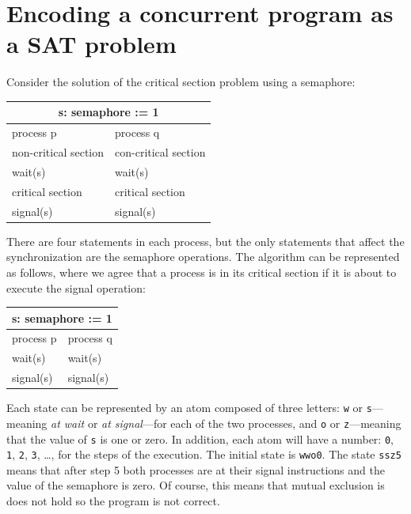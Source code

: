 \documentclass[11pt]{report}
\newcommand*{\p}[1]{\textup{\texttt{#1}}}
\begin{document}
\section{Encoding a concurrent program as a SAT problem}

Consider the solution of the critical section problem using a semaphore:

\begin{center}
\begin{tabular}{|l|l|}
\hline
\multicolumn{2}{|c|}{s: semaphore := 1}\\\hline
process p & process q\\\hline
non-critical section & con-critical section \\
wait(s) & wait(s) \\
critical section & critical section \\
signal(s) & signal(s)\\\hline
\end{tabular}
\end{center}

There are four statements in each process, but the only statements that
affect the synchronization are the semaphore operations. The algorithm
can be represented as follows, where we agree that a process is in its
critical section if it is about to execute the signal operation:

\begin{center}
\begin{tabular}{|l|l|}
\hline
\multicolumn{2}{|c|}{s: semaphore := 1}\\\hline
process p & process q\\\hline
wait(s) & wait(s) \\
signal(s) & signal(s)\\\hline
\end{tabular}
\end{center}

Each state can be represented by an atom composed of three letters:
\p{w} or \p{s}---meaning \emph{at wait} or \emph{at signal}---for each
of the two processes, and \p{o} or \p{z}---meaning that the value of
\p{s} is one or zero. In addition, each atom will have a number: \p{0},
\p{1}, \p{2}, \p{3}, \ldots, for the steps of the execution. The initial
state is \p{wwo0}. The state \p{ssz5} means that after step 5 both
processes are at their signal instructions and the value of the
semaphore is zero. Of course, this means that mutual exclusion is does
not hold so the program is not correct.
\end{document}
